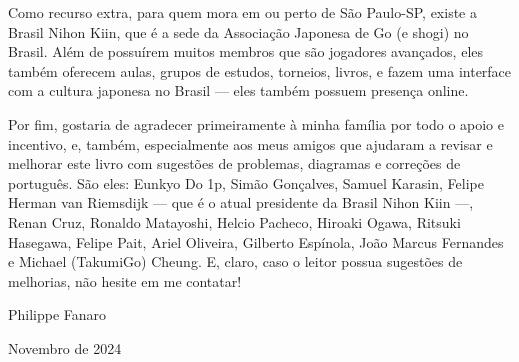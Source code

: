 Como recurso extra, para quem mora em ou perto de São Paulo-SP, existe a Brasil Nihon Kiin, que é a sede da Associação Japonesa de Go (e shogi) no Brasil. Além de possuírem muitos membros que são jogadores avançados, eles também oferecem aulas, grupos de estudos, torneios, livros, e fazem uma interface com a cultura japonesa no Brasil --- eles também possuem presença online.

Por fim, gostaria de agradecer primeiramente à minha família por todo o apoio e incentivo, e, também, especialmente aos meus amigos que ajudaram a revisar e melhorar este livro com sugestões de problemas, diagramas e correções de português. São eles: Eunkyo Do 1p, Simão Gonçalves, Samuel Karasin, Felipe Herman van Riemsdijk --- que é o atual presidente da Brasil Nihon Kiin ---, Renan Cruz, Ronaldo Matayoshi, Helcio Pacheco, Hiroaki Ogawa, Ritsuki Hasegawa, Felipe Pait, Ariel Oliveira, Gilberto Espínola, João Marcus Fernandes e Michael (TakumiGo) Cheung. E, claro, caso o leitor possua sugestões de melhorias, não hesite em me contatar!

\bigskip

\hspace*{\fill} Philippe Fanaro \hspace{0.055cm}

\hspace*{\fill} Novembro de 2024 \hspace{0.05cm}

\clearedpage
\clearedpage